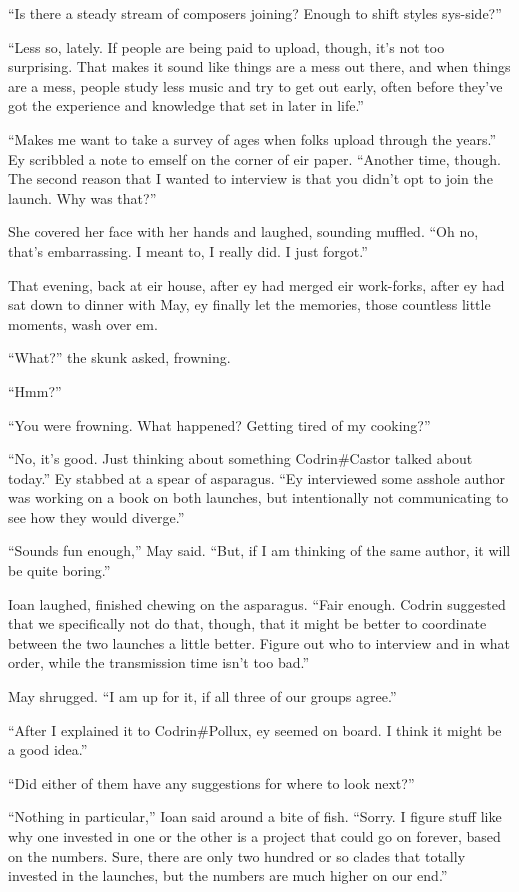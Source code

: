 ``Is there a steady stream of composers joining? Enough to shift styles sys-side?''

``Less so, lately. If people are being paid to upload, though, it's not too surprising. That makes it sound like things are a mess out there, and when things are a mess, people study less music and try to get out early, often before they've got the experience and knowledge that set in later in life.''

``Makes me want to take a survey of ages when folks upload through the years.'' Ey scribbled a note to emself on the corner of eir paper. ``Another time, though. The second reason that I wanted to interview is that you didn't opt to join the launch. Why was that?''

She covered her face with her hands and laughed, sounding muffled. ``Oh no, that's embarrassing. I meant to, I really did. I just forgot.''

That evening, back at eir house, after ey had merged eir work-forks, after ey had sat down to dinner with May, ey finally let the memories, those countless little moments, wash over em.

``What?'' the skunk asked, frowning.

``Hmm?''

``You were frowning. What happened? Getting tired of my cooking?''

``No, it's good. Just thinking about something Codrin\#Castor talked about today.'' Ey stabbed at a spear of asparagus. ``Ey interviewed some asshole author was working on a book on both launches, but intentionally not communicating to see how they would diverge.''

``Sounds fun enough,'' May said. ``But, if I am thinking of the same author, it will be quite boring.''

Ioan laughed, finished chewing on the asparagus. ``Fair enough. Codrin suggested that we specifically not do that, though, that it might be better to coordinate between the two launches a little better. Figure out who to interview and in what order, while the transmission time isn't too bad.''

May shrugged. ``I am up for it, if all three of our groups agree.''

``After I explained it to Codrin\#Pollux, ey seemed on board. I think it might be a good idea.''

``Did either of them have any suggestions for where to look next?''

``Nothing in particular,'' Ioan said around a bite of fish. ``Sorry. I figure stuff like why one invested in one or the other is a project that could go on forever, based on the numbers. Sure, there are only two hundred or so clades that totally invested in the launches, but the numbers are much higher on our end.''

